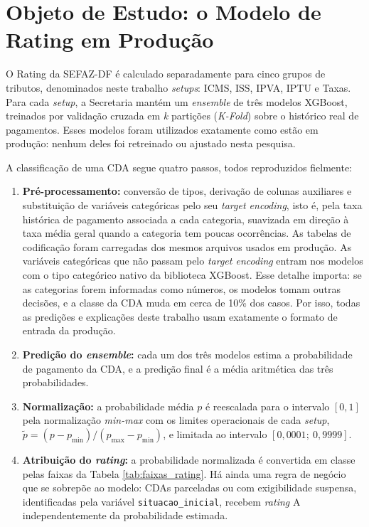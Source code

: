 \section{Objeto de Estudo: o Modelo de Rating em Produção}
\label{sec:modelo_producao}

O Rating da SEFAZ-DF é calculado separadamente para cinco grupos de tributos, denominados neste trabalho \textit{setups}: ICMS, ISS, IPVA, IPTU e Taxas. Para cada \textit{setup}, a Secretaria mantém um \textit{ensemble} de três modelos XGBoost, treinados por validação cruzada em \textit{k} partições (\textit{K-Fold}) sobre o histórico real de pagamentos. Esses modelos foram utilizados exatamente como estão em produção: nenhum deles foi retreinado ou ajustado nesta pesquisa.

A classificação de uma CDA segue quatro passos, todos reproduzidos fielmente:

\begin{enumerate}
    \item \textbf{Pré-processamento:} conversão de tipos, derivação de colunas auxiliares e substituição de variáveis categóricas pelo seu \textit{target encoding}, isto é, pela taxa histórica de pagamento associada a cada categoria, suavizada em direção à taxa média geral quando a categoria tem poucas ocorrências. As tabelas de codificação foram carregadas dos mesmos arquivos usados em produção. As variáveis categóricas que não passam pelo \textit{target encoding} entram nos modelos com o tipo categórico nativo da biblioteca XGBoost. Esse detalhe importa: se as categorias forem informadas como números, os modelos tomam outras decisões, e a classe da CDA muda em cerca de 10\% dos casos. Por isso, todas as predições e explicações deste trabalho usam exatamente o formato de entrada da produção.
    \item \textbf{Predição do \textit{ensemble}:} cada um dos três modelos estima a probabilidade de pagamento da CDA, e a predição final é a média aritmética das três probabilidades.
    \item \textbf{Normalização:} a probabilidade média $p$ é reescalada para o intervalo $[0,1]$ pela normalização \textit{min-max} com os limites operacionais de cada \textit{setup}, $\tilde{p} = (p - p_{\min}) / (p_{\max} - p_{\min})$, e limitada ao intervalo $[0{,}0001;\ 0{,}9999]$.
    \item \textbf{Atribuição do \textit{rating}:} a probabilidade normalizada é convertida em classe pelas faixas da Tabela \ref{tab:faixas_rating}. Há ainda uma regra de negócio que se sobrepõe ao modelo: CDAs parceladas ou com exigibilidade suspensa, identificadas pela variável \texttt{situacao\_inicial}, recebem \textit{rating} A independentemente da probabilidade estimada.
\end{enumerate}

